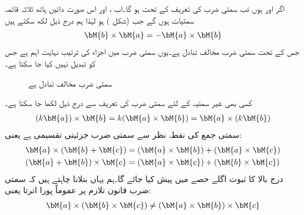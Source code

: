 اگر اور  ہوں تب سمتی ضرب کی تعریف کے تحت  ہو گا۔اب  ،  اور  اس صورت دائیں ہاتھ ثلاثہ قائمہ سمتیات ہوں گے جب  (شکل ) ہو لہٰذا ہم درج ذیل لکھ سکتے ہیں
\begin{align}
\bM{b} \times \bM{a}=-\bM{a}\times \bM{b}
\end{align}
جس کے تحت سمتی ضرب مخالف تبادل ہے۔یوں سمتی ضرب میں اجزاء کی ترتیب نہایت اہم ہے جس کو تبدیل نہیں کیا جا سکتا ہے۔
\begin{figure}
\centering
{}
\caption{سمتی ضرب مخالف تبادل ہے}
\label{شکل_الجبرا_مخالف_تبادل_سمتی_ضرب}
\end{figure}

کسی بھی غیر سمتیہ  کے لئے سمتی ضرب کی تعریف سے درج ذیل لکھا جا سکتا ہے۔
\begin{align}
(k\bM{a})\times \bM{b}=k(\bM{a}\times \bM{b})=\bM{a}\times(k\bM{b})
\end{align}
سمتی جمع کی نقطہ نظر سے سمتی ضرب جزئیتی تقسیمی ہے یعنی:
\begin{gather}
\begin{aligned}\label{مساوت_الجبرا_جزئیتی_تقسیم_برائے_سمتی_ضرب}
\bM{a}\times (\bM{b}+\bM{c})&=(\bM{a}\times \bM{b})+(\bM{a}\times \bM{c})\\
(\bM{a}+\bM{b})\times \bM{c}&=(\bM{a}\times \bM{c})+(\bM{b}\times \bM{c})
\end{aligned}
\end{gather}
درج بالا کا ثبوت اگلے حصے میں پیش کیا جائے گا۔ہم یہاں بتلانا چاہتے ہیں کہ سمتی ضرب قانون تلازم  پر عموماً پورا  اترتا یعنی:
\begin{align*}
\bM{a}\times (\bM{b}\times \bM{c}) \ne (\bM{a}\times \bM{b})\times \bM{c}
\end{align*}

